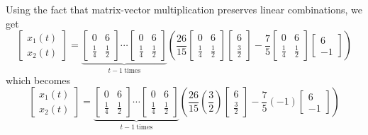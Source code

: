 \documentclass[../book.tex]{subfiles}
\begin{document}
Using the fact that matrix-vector multiplication preserves linear combinations, we get
\begin{equation}\label{eq:eig-40}
\begin{bmatrix}
  x_1 (t) \\ x_2(t)
\end{bmatrix}
=
\underbrace{
  \begin{bmatrix}
    0 & 6 \\ \frac{1}{4} & \frac{1}{2}
  \end{bmatrix}
  \cdots
  \begin{bmatrix}
    0 & 6 \\ \frac{1}{4} & \frac{1}{2}
  \end{bmatrix}
}_{t-1\ \text{times}}
\left(
  \frac{26}{15}  
  \begin{bmatrix}
    0 & 6 \\ \frac{1}{4} & \frac{1}{2}
  \end{bmatrix}
  \begin{bmatrix}
    6 \\ \frac{3}{2}
  \end{bmatrix}
  -
  \frac{7}{5} 
  \begin{bmatrix}
    0 & 6 \\ \frac{1}{4} & \frac{1}{2}
  \end{bmatrix}
  \begin{bmatrix}
    6 \\ - 1
  \end{bmatrix}
\right)
\end{equation}
which becomes
\begin{equation}\label{eq:eig-41}
\begin{bmatrix}
  x_1 (t) \\ x_2(t)
\end{bmatrix}
=
\underbrace{
  \begin{bmatrix}
    0 & 6 \\ \frac{1}{4} & \frac{1}{2}
  \end{bmatrix}
  \cdots
  \begin{bmatrix}
    0 & 6 \\ \frac{1}{4} & \frac{1}{2}
  \end{bmatrix}
}_{t-1\ \text{times}}
\left(
  \frac{26}{15}  
  \left(\frac{3}{2}\right)  
  \begin{bmatrix}
    6 \\ \frac{3}{2}
  \end{bmatrix}
  -
  \frac{7}{5} 
  (-1) 
  \begin{bmatrix}
    6 \\ - 1
  \end{bmatrix}
\right)
\end{equation}
\end{document}
